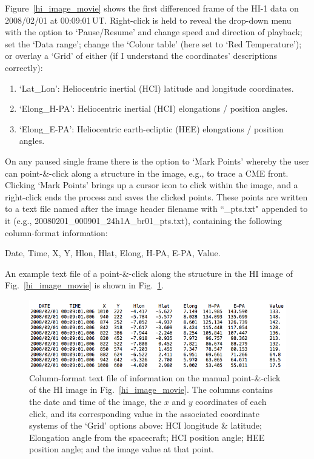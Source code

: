 \documentclass[12pt, a4paper, oneside]{article}
\begin{document}
Figure~\ref{hi_image_movie} shows the first differenced frame of the HI-1 data on 2008/02/01 at 00:09:01\,UT. Right-click is held to reveal the drop-down menu with the option to `Pause/Resume' and change speed and direction of playback; set the `Data range'; change the `Colour table' (here set to `Red Temperature'); or overlay a `Grid' of either (if I understand the coordinates' descriptions correctly):
\begin{enumerate}
\item `Lat\_Lon': Heliocentric inertial (HCI) latitude and longitude coordinates.
\item `Elong\_H-PA': Heliocentric inertial (HCI) elongations / position angles. 
\item `Elong\_E-PA': Heliocentric earth-ecliptic (HEE) elongations / position angles.
\end{enumerate}

On any paused single frame there is the option to `Mark Points' whereby the user can point-\&-click along a structure in the image, e.g., to trace a CME front. Clicking `Mark Points' brings up a cursor icon to click within the image, and a right-click ends the process and saves the clicked points. These points are written to a text file named after the image header filename with ``\_pts.txt" appended to it (e.g., 20080201\_000901\_24h1A\_br01\_pts.txt), containing the following column-format information:

Date, Time, X, Y, Hlon, Hlat, Elong, H-PA, E-PA, Value.

\noindent An example text file of a point-\&-click along the structure in the HI image of Fig.~\ref{hi_image_movie} is shown in Fig.~\ref{textfile}.

\begin{figure}[]
\centering
\includegraphics[width=\linewidth]{textfile.png}
\caption{Column-format text file of information on the manual point-\&-click of the HI image in Fig.~\ref{hi_image_movie}. The columns contains the date and time of the image, the $x$ and $y$ coordinates of each click, and its corresponding value in the associated coordinate systems of the `Grid' options above: HCI longitude \& latitude; Elongation angle from the spacecraft; HCI position angle; HEE position angle; and the image value at that point.}
\label{textfile}
\end{figure}
\end{document}
